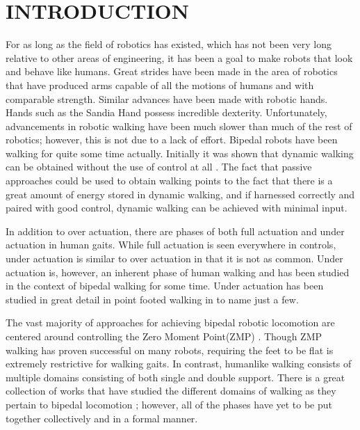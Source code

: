 \section{INTRODUCTION}

For as long as the field of robotics has existed, which has not been very long relative to other areas of engineering,
it has been a goal to make robots that look and behave like humans. Great strides have been made in the area of
robotics that have produced arms capable of all the motions of humans and with comparable strength. Similar advances
have been made with robotic hands. Hands such as the Sandia Hand \cite{url:Sandia_National_Labs} possess
incredible dexterity. Unfortunately, advancements in robotic walking have been much slower than much of
the rest of robotics; however, this is not due to a lack of effort. Bipedal robots have been walking for quite some time actually. Initially it
was shown that dynamic walking can be obtained without the use of control at all \cite{McGeer90a,CRTW05}.
The fact that passive approaches could be used to obtain walking points to the fact that there is a great amount
of energy stored in dynamic walking, and if harnessed correctly and paired with good control, dynamic walking can
be achieved with minimal input.

In addition to over actuation, there are phases of both full actuation and under actuation in human gaits. While full actuation is seen
everywhere in controls, under actuation is similar to over actuation in that it is not as common. Under actuation is,
however, an inherent phase of human walking and has been studied in the context of bipedal walking for some time. Under
actuation has been studied in great detail in point footed walking in \cite{GCS09,SGC07,WGCCM07,Ames12} to name just a few.

The vast majority of approaches for achieving bipedal robotic locomotion
are centered around controlling the Zero Moment Point(ZMP) \cite{FAA10,KKKFHYH06,TIOMA05}. Though ZMP walking has proven
successful on many robots, requiring the feet to be flat is extremely restrictive for walking gaits. In contrast, humanlike
walking consists of multiple domains consisting of both single and double support. There is a great collection of works that have studied the different domains of walking
as they pertain to bipedal locomotion \cite{SPSA11,SA09a}; however, all of the phases have yet to be put together collectively and
in a formal manner.

